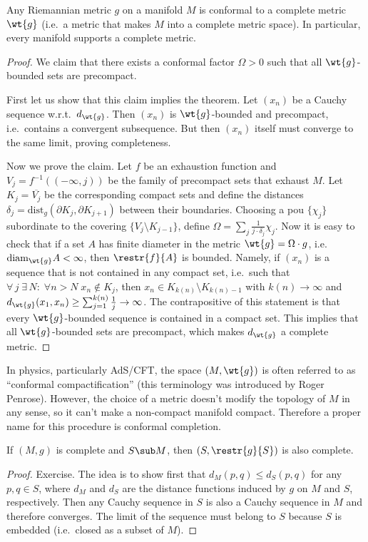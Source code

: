 \begin{thm}
    Any Riemannian metric $g$ on a manifold $M$ is conformal to a complete metric $\wt{g}$ (i.e.\ a metric that makes $M$ into a complete metric space). In particular, every manifold supports a complete metric.
\end{thm}
\begin{proof}
    We claim that there exists a conformal factor $\Omega>0$ such that all $\wt{g}$-bounded sets are precompact.

    First let us show that this claim implies the theorem. Let $(x_n)$ be a Cauchy sequence w.r.t.\ $d_{\wt{g}}$. Then $(x_n)$ is $\wt{g}$-bounded and precompact, i.e.\ contains a convergent subsequence. But then $(x_n)$ itself must converge to the same limit, proving completeness.

    Now we prove the claim. Let $f$ be an exhaustion function and $V_j=f^{-1}((-\infty,j))$ be the family of precompact sets that exhaust $M$. Let $K_j=\overline{V_j}$ be the corresponding compact sets and define the distances $\delta_j=\mathrm{dist}_g(\partial K_j,\partial K_{j+1})$ between their boundaries. Choosing a \gls{pou} $\{\chi_j\}$ subordinate to the covering $\{V_{j}\setminus K_{j-1}\}$, define $\Omega=\sum_j \frac{1}{j\cdot \delta_j} \chi_j$. Now it is easy to check that if a set $A$ has finite diameter in the metric $\wt{g}=\Omega\cdot g$, i.e.\ $\mathrm{diam}_{\wt{g}} A<\infty$, then $\restr{f}{A}$ is bounded. Namely, if $(x_n)$ is a sequence that is not contained in any compact set, i.e.\ such that $\forall\,j \;\exists\, N:\;\forall n>N \;x_n\notin K_j$, then $x_n\in K_{k(n)}\setminus K_{k(n)-1}$ with $k(n)\to\infty$ and  $d_{\wt{g}}(x_1,x_n)\geq\sum_{j=1}^{k(n)} \frac{1}{j}\to\infty$. The contrapositive of this statement is that every $\wt{g}$-bounded sequence is contained in a compact set. This implies that all $\wt{g}$-bounded sets are precompact, which makes $d_{\wt{g}}$ a complete metric.
\end{proof}
\begin{rem}
    In physics, particularly AdS/CFT, the space $(M,\wt{g})$ is often referred to as ``conformal compactification'' (this terminology was introduced by Roger Penrose). However, the choice of a metric doesn't modify the topology of $M$ in any sense, so it can't make a non-compact manifold compact. Therefore a proper name for this procedure is conformal completion.
\end{rem}

\begin{prop}
    If $(M,g)$ is complete and $S\sub M$, then $(S,\restr{g}{S})$ is also complete.
\end{prop}
\begin{proof}
    Exercise. The idea is to show first that $d_M(p,q)\leq d_S(p,q)$ for any $p,q\in S$, where $d_M$ and $d_S$ are the distance functions induced by $g$ on $M$ and $S$, respectively. Then any Cauchy sequence in $S$ is also a Cauchy sequence in $M$ and therefore converges. The limit of the sequence must belong to $S$ because $S$ is embedded (i.e.\ closed as a subset of $M$).
\end{proof}

